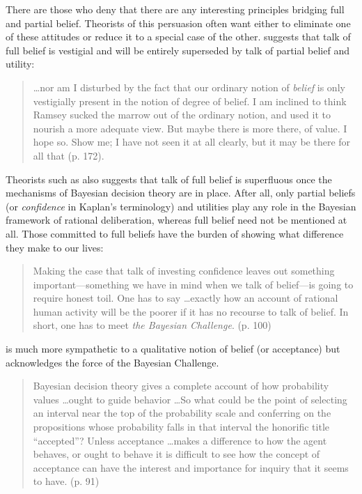There are those who deny that there are any interesting principles bridging full
and partial belief. Theorists of this persuasion often want either to eliminate
one of these attitudes or reduce it to a special case of the other.
\citet{jeffrey1970} suggests that talk of full belief is vestigial and will be
entirely superseded by talk of partial belief and utility:
\begin{quote}
\ldots  nor am I disturbed by the fact that our ordinary notion of {\em belief}
is only vestigially present in the notion of degree of belief. I am inclined to
think Ramsey sucked the marrow out of the ordinary notion, and used it to
nourish a more adequate view. But maybe there is more there, of value. I hope
so. Show me; I have not seen it at all clearly, but it may be there for all that
(p. 172). 
\end{quote}
Theorists such as \citet{kaplan1996decision} also suggests that talk of full
belief is superfluous once the mechanisms of Bayesian decision theory are in
place. After all, only partial beliefs (or {\em confidence} in Kaplan's
terminology) and utilities play any role in the Bayesian framework of rational
deliberation, whereas full belief need not be mentioned at all. Those committed
to full beliefs have the burden of showing what difference they make to our
lives:
\begin{quote}
Making the case that talk of investing confidence leaves out something
important---something we have in mind when we talk of belief---is going to
require honest toil. One has to say \ldots exactly how an account of rational
human activity will be the poorer if it has no recourse to talk of belief. In
short, one has to meet {\em the Bayesian Challenge}. (p. 100)
\end{quote}
\citet{stalnaker1984inquiry} is much more sympathetic to a qualitative notion of
belief (or acceptance) but acknowledges the force of the Bayesian Challenge.
\begin{quote}
Bayesian decision theory gives a complete account of how probability values
\ldots ought to guide behavior \ldots So what could be the point of selecting an
interval near the top of the probability scale and conferring on the
propositions whose probability falls in that interval the honorific title
``accepted''? Unless acceptance \ldots makes a difference to how the agent
behaves, or ought to behave it is difficult to see how the concept of acceptance
can have the interest and importance for inquiry that it seems to have. (p. 91)
\end{quote}

